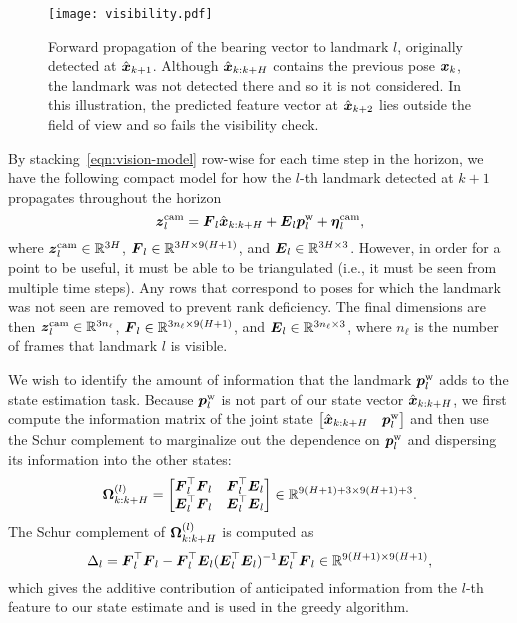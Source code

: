 \begin{figure}
\centering
\texttt{[image: visibility.pdf]} 
\caption{Forward propagation of the bearing vector to landmark $l$, originally detected at $\hat{\boldsymbol x}_{k+1}$. Although $\hat{\boldsymbol x}_{k:k+H}$ contains the previous pose $\boldsymbol x_k$, the landmark was not detected there and so it is not considered. In this illustration, the predicted feature vector at $\hat{\boldsymbol x}_{k+2}$ lies outside the field of view and so fails the visibility check.}
\label{fig:visibility}
\end{figure}

By stacking~\eqref{eqn:vision-model} row-wise for each time step in the horizon, we have the following compact model for how the $l$-th landmark detected at $k+1$ propagates throughout the horizon
\begin{equation}\label{eqn:vision-model-stacked}
\boldsymbol z_l^\text{cam} = \boldsymbol F_l\hat{\boldsymbol x}_{k:k+H} + \boldsymbol E_l\boldsymbol p^\text{w}_l + \boldsymbol \eta_l^\text{cam},
\end{equation}
where $\boldsymbol z_l^\text{cam}\in\mathbb{R}^{3H}$, $\boldsymbol F_l\in\mathbb{R}^{3H\times 9(H+1)}$, and $\boldsymbol E_l\in\mathbb{R}^{3H\times 3}$.
However, in order for a point to be useful, it must be able to be triangulated (i.e., it must be seen from multiple time steps).
Any rows that correspond to poses for which the landmark was not seen are removed to prevent rank deficiency.
The final dimensions are then $\boldsymbol z_l^\text{cam}\in\mathbb{R}^{3n_\ell}$, $\boldsymbol F_l\in\mathbb{R}^{3n_\ell\times 9(H+1)}$, and $\boldsymbol E_l\in\mathbb{R}^{3n_\ell\times 3}$, where $n_\ell$ is the number of frames that landmark $l$ is visible.

We wish to identify the amount of information that the landmark $\boldsymbol p^\text{w}_l$ adds to the state estimation task.
Because $\boldsymbol p^\text{w}_l$ is not part of our state vector $\hat{\boldsymbol x}_{k:k+H}$, we first compute the information matrix of the joint state $\begin{bmatrix}\hat{\boldsymbol x}_{k:k+H}&\boldsymbol p^\text{w}_l\end{bmatrix}$ and then use the Schur complement to marginalize out the dependence on $\boldsymbol p^\text{w}_l$ and dispersing its information into the other states:
\begin{equation*}
{\boldsymbol \Omega}_{k:k+H}^{(l)} =
\begin{bmatrix}
\boldsymbol F_l^\top\boldsymbol F_l & \boldsymbol F_l^\top\boldsymbol E_l \\
\boldsymbol E_l^\top\boldsymbol F_l & \boldsymbol E_l^\top\boldsymbol E_l
\end{bmatrix}
\in\mathbb{R}^{9(H+1)+3\times9(H+1)+3}.
\end{equation*}
The Schur complement of ${\boldsymbol \Omega}_{k:k+H}^{(l)}$ is computed as
\begin{equation}\label{eqn:schur}
\Delta_l = \boldsymbol F_l^\top\boldsymbol F_l - \boldsymbol F_l^\top\boldsymbol E_l(\boldsymbol E_l^\top\boldsymbol E_l)^{-1}\boldsymbol E_l^\top\boldsymbol F_l \in\mathbb{R}^{9(H+1)\times9(H+1)},
\end{equation}
which gives the additive contribution of anticipated information from the $l$-th feature to our state estimate and is used in the greedy algorithm.

